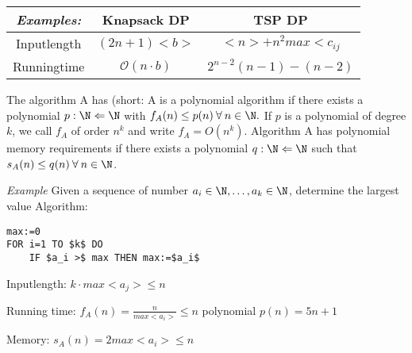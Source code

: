 \begin{xmp+}
	\begin{tabular}{c|c|c}
	\emph{Examples:} & Knapsack DP & TSP DP \\
	\hline
	Inputlength & $(2n+1)<b>$ & $<n>+n^2 max<c_{ij}$ \\
	Runningtime & $\mathcal{O} (n\cdot b)$ & $2^{n-2}(n-1)-(n-2)$ \\
	\end{tabular}
\end{xmp+}

The algorithm A has  (short: A is a polynomial algorithm if there exists a polynomial $p:\N \Leftarrow \N $ with $f_A(n) \leq p(n) \: \forall \: n \in \N.$ If $p$ is a polynomial of degree $k$, we call $f_A$ of order $n^k$ and write $f_A= O(n^k)$. Algorithm A has polynomial memory requirements if there exists a polynomial $q:\N \Leftarrow \N$ such that $s_A(n) \leq q(n) \: \forall \: n \in \N$.

\emph{Example} Given a sequence of number $ a_i\in \N, \dots, a_k \in \N$, determine the largest value
Algorithm:
\begin{lstlisting}
max:=0
FOR i=1 TO $k$ DO
	IF $a_i >$ max THEN max:=$a_i$
\end{lstlisting}
Inputlength: $k \cdot max<a_j> \leq n$

Running time: $f_A(n)=\frac n {max<a_i>} \leq n$
				polynomial $p(n)=5n+1 $
				
Memory: $s_A(n)=2 max<a_i> \leq n$
